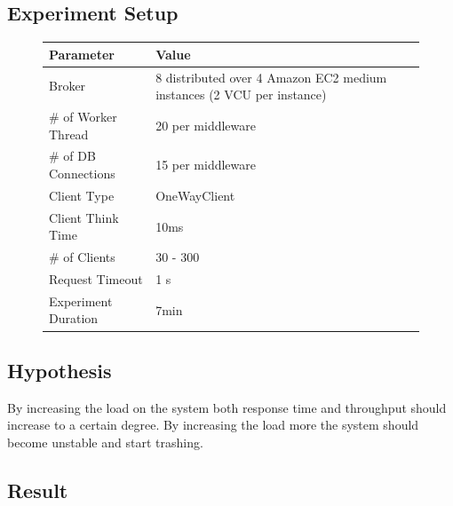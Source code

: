 \documentclass[a4paper]{article}
\begin{document}
\subsection{Experiment Setup}


\begin{figure}[H]
\label{tabular:experimentsetup}
\begin{center}
\begin{tabular}{|l|l|}
\hline 
\textbf{Parameter} & \textbf{Value} \\ 
\hline 
Broker & 8 distributed over 4 Amazon EC2 medium  instances (2 VCU per instance)\\ 
\hline 
\# of Worker Thread & 20 per middleware \\
\hline 
\# of DB Connections & 15 per middleware \\
\hline 
Client Type & OneWayClient \\ 
\hline 
Client Think Time & 10ms \\ 
\hline 
\# of Clients & 30 - 300 \\ 
\hline 
Request Timeout & 1 s\\
\hline 
Experiment Duration & 7min \\ 
\hline 
\end{tabular} 
\end{center}
\end{figure}


\subsection{Hypothesis}

By increasing the load on the system both response time and throughput should increase to
a certain degree. By increasing the load more the system should become unstable and start
trashing.

\subsection{Result}


\end{document}

